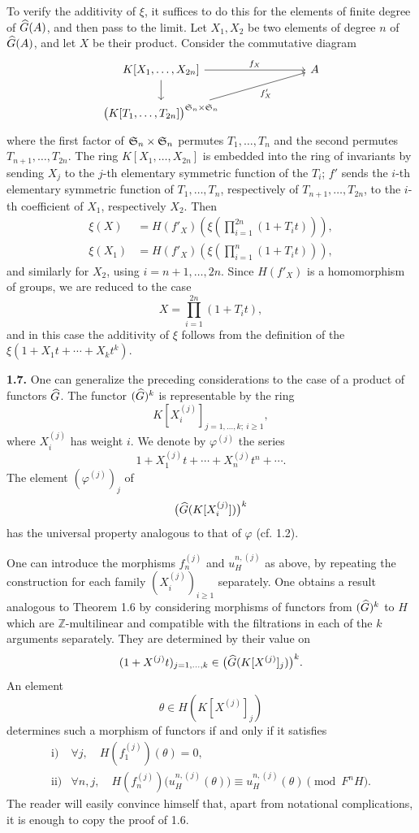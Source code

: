 \documentclass[11pt]{article}
\begin{document}
To verify the additivity of \(\xi\), it suffices to do this for the elements of finite degree of \(\widehat G(A)\), and then pass to the limit. Let \(X_1,X_2\) be two elements of degree \(n\) of \(\widehat G(A)\), and let \(X\) be their product. Consider the commutative diagram
\[
\begin{tikzcd}[column sep=large]
K[X_1,\ldots,X_{2n}] \arrow[rr,"f_X"] \arrow[d] && A\\
\bigl(K[T_1,\ldots,T_{2n}]\bigr)^{\Sym_n\times\Sym_n}
\arrow[urr,"f'_X"'] &&
\end{tikzcd}
\]
where the first factor of \(\mathfrak S_n\times\mathfrak S_n\) permutes \(T_1,\ldots,T_n\) and the second permutes \(T_{n+1},\ldots,T_{2n}\). The ring \(K[X_1,\ldots,X_{2n}]\) is embedded into the ring of invariants by sending \(X_j\) to the \(j\)-th elementary symmetric function of the \(T_i\); \(f'\) sends the \(i\)-th elementary symmetric function of \(T_1,\ldots,T_n\), respectively of \(T_{n+1},\ldots,T_{2n}\), to the \(i\)-th coefficient of \(X_1\), respectively \(X_2\). Then
\[
\begin{aligned}
\xi(X)
&=H(f'_X)\left(\xi\left(\prod_{i=1}^{2n}(1+T_it)\right)\right),\\
\xi(X_1)
&=H(f'_X)\left(\xi\left(\prod_{i=1}^{n}(1+T_it)\right)\right),
\end{aligned}
\]
and similarly for \(X_2\), using \(i=n+1,\ldots,2n\). Since \(H(f'_X)\) is a homomorphism of groups, we are reduced to the case
\[
  X=\prod_{i=1}^{2n}(1+T_it),
\]
and in this case the additivity of \(\xi\) follows from the definition of the \(\xi(1+X_1t+\cdots+X_k t^k)\).

\textbf{1.7.} One can generalize the preceding considerations to the case of a product of functors \(\widehat G\). The functor \((\widehat G)^k\) is representable by the ring
\[
  K[X_i^{(j)}]_{j=1,\ldots,k;\ i\geq 1},
\]
where \(X_i^{(j)}\) has weight \(i\). We denote by \(\varphi^{(j)}\) the series
\[
  1+X_1^{(j)}t+\cdots+X_n^{(j)}t^n+\cdots.
\]
The element \((\varphi^{(j)})_j\) of
\[
  \bigl(\widehat G(K[X_i^{(j)}])\bigr)^k
\]
has the universal property analogous to that of \(\varphi\) (cf. 1.2).

One can introduce the morphisms \(f_n^{(j)}\) and \(u_H^{n,(j)}\) as above, by repeating the construction for each family \((X_i^{(j)})_{i\geq 1}\) separately. One obtains a result analogous to Theorem 1.6 by considering morphisms of functors from \((\widehat G)^k\) to \(H\) which are \(\mathbb Z\)-multilinear and compatible with the filtrations in each of the \(k\) arguments separately. They are determined by their value on
\[
  (1+X^{(j)}t)_{j=1,\ldots,k}
  \in \bigl(\widehat G(K[X^{(j)}]_j)\bigr)^k.
\]
An element
\[
  \theta\in H(K[X^{(j)}]_j)
\]
determines such a morphism of functors if and only if it satisfies
\[
\begin{array}{ll}
\text{i)} & \forall j,\quad H(f_1^{(j)})(\theta)=0,\\[0.3em]
\text{ii)}& \forall n,j,\quad
 H(f_n^{(j)})\bigl(u_H^{n,(j)}(\theta)\bigr)
 \equiv u_H^{n,(j)}(\theta)\pmod{F^nH}.
\end{array}
\]
The reader will easily convince himself that, apart from notational complications, it is enough to copy the proof of 1.6.
\end{document}
